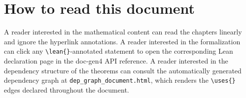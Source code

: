 \section*{How to read this document}

A reader interested in the mathematical content can read the chapters
linearly and ignore the hyperlink annotations. A reader interested in
the formalization can click any
\texttt{\textbackslash lean\{\}}-annotated statement to open the
corresponding Lean declaration page in the doc-gen4 API reference. A
reader interested in the dependency structure of the theorems can
consult the automatically generated dependency graph at
\texttt{dep\_graph\_document.html}, which renders the
\texttt{\textbackslash uses\{\}} edges declared throughout the
document.
